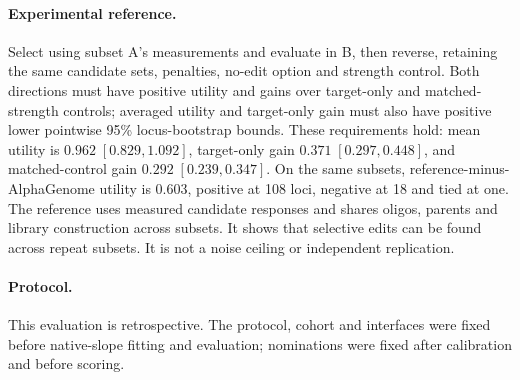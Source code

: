 \paragraph{Experimental reference.}
Select using subset A's measurements and evaluate in B, then reverse, retaining the
same candidate sets, penalties, no-edit option and strength control. Both directions must
have positive utility and gains over target-only and matched-strength controls;
averaged utility and target-only gain must also have positive lower pointwise
95\% locus-bootstrap bounds. These requirements hold: mean utility is
$0.962\;[0.829,1.092]$, target-only gain $0.371\;[0.297,0.448]$, and matched-control
gain $0.292\;[0.239,0.347]$. On the same subsets, reference-minus-AlphaGenome
utility is $0.603$, positive at 108 loci, negative at 18 and tied at one.
The reference uses measured candidate responses and shares oligos, parents and
library construction across subsets. It shows that selective edits can be found
across repeat subsets.
It is not a noise ceiling or independent replication.

\paragraph{Protocol.}
This evaluation is retrospective. The protocol, cohort and interfaces were fixed
before native-slope fitting and evaluation; nominations were fixed after calibration
and before scoring.

